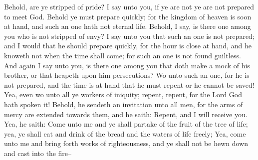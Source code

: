Behold, are ye stripped of pride? I say unto you, if ye are not ye are not prepared to meet God. Behold ye must prepare quickly; for the kingdom of heaven is soon at hand, and such an one hath not eternal life.
\bverse \iffalse Behold, I say, is there one among you who is not stripped of envy? I say unto you that such an one is not prepared; and I would that he should prepare quickly, for the hour is close at hand, and he knoweth not when the time shall come; for such an one is not found guiltless. \fi
Behold, I say, is there one among you who is not stripped of envy? I say unto you that such an one is not prepared; and I would that he should prepare quickly, for the hour is close at hand, and he knoweth not when the time shall come; for such an one is not found guiltless.
\bverse \iffalse And again I say unto you, is there one among you that doth make a mock of his brother, or that heapeth upon him persecutions? \fi
And again I say unto you, is there one among you that doth make a mock of his brother, or that heapeth upon him persecutions?
\bverse \iffalse Wo unto such an one, for he is not prepared, and the time is at hand that he must repent or he cannot be saved! \fi
Wo unto such an one, for he is not prepared, and the time is at hand that he must repent or he cannot be saved!
\bverse \iffalse Yea, even wo unto all ye workers of iniquity; repent, repent, for the Lord God hath spoken it! \fi
Yea, even wo unto all ye workers of iniquity; repent, repent, for the Lord God hath spoken it!
\bverse \iffalse Behold, he sendeth an invitation unto all men, for the arms of mercy are extended towards them, and he saith: Repent, and I will receive you. \fi
Behold, he sendeth an invitation unto all men, for the arms of mercy are extended towards them, and he saith: Repent, and I will receive you.
\bverse \iffalse Yea, he saith: Come unto me and ye shall partake of the fruit of the tree of life; yea, ye shall eat and drink of the bread and the waters of life freely; \fi
Yea, he saith: Come unto me and ye shall partake of the fruit of the tree of life; yea, ye shall eat and drink of the bread and the waters of life freely;
\bverse \iffalse Yea, come unto me and bring forth works of righteousness, and ye shall not be hewn down and cast into the fire-- \fi
Yea, come unto me and bring forth works of righteousness, and ye shall not be hewn down and cast into the fire--
\bverse \iffalse For behold, the time is at hand that whosoever bringeth forth not good fruit, or whosoever doeth not the works of righteousness, the same have cause to wail and mourn. \fi
